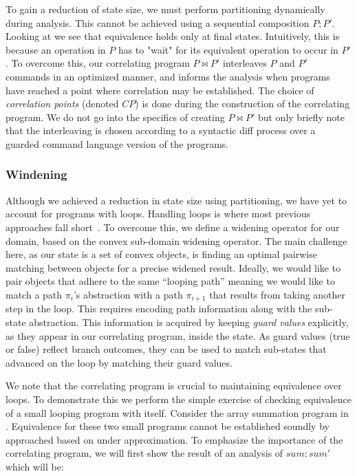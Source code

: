 To gain a reduction of state size, we must perform partitioning dynamically during analysis. This cannot be achieved using a sequential composition $P;P'$. Looking at  we see that equivalence holds only at final states. Intuitively, this is because an operation in $P$ has to "wait" for its equivalent operation to occur in $P'$. To overcome this, our correlating program $P \bowtie P'$ interleaves $P$ and $P'$ commands in an optimized manner, and informs the analysis when programs have reached a point where correlation may be established.
The choice of \emph{correlation points} (denoted $CP$) is done during the construction of the correlating program. We do not go into the specifics of creating $P \bowtie P'$ but only briefly note that the interleaving is chosen according to a syntactic diff process over a guarded command language version of the programs.



\subsubsection{Windening}
Although we achieved a reduction in state size using partitioning, we have yet to account for programs with loops. Handling loops is where most previous approaches fall short~\cite{GodlinStrichman09, KawaguchiLahiriRebelo10, DwyerElbaumPerson08, EnglerRamos11}. To overcome this, we define a widening operator for our domain, based on the convex sub-domain widening operator. The main challenge here, as our state is a set of convex objects, is finding an optimal pairwise matching between objects for a precise widened result. Ideally, we would like to pair objects that adhere to the same ``looping path'' meaning we would like to match a path $\pi_i$'s abstraction with a path $\pi_{i+1}$ that results from taking another step in the loop. This requires encoding path information along with the sub-state abstraction. This information is acquired by keeping \emph{guard values} explicitly, as they appear in our correlating program, inside the state. As guard values (true or false) reflect branch outcomes, they can be used to match sub-states that advanced on the loop by matching their guard values.



We note that the correlating program is crucial to maintaining equivalence over loops. To demonstrate this we perform the simple exercise of checking equivalence of a small looping program with itself. Consider the array summation program in . Equivalence for these two small programs cannot be established soundly by approached based on under approximation. To emphasize the importance of the correlating program, we will first show the result of an analysis of $sum;sum'$ which will be:

